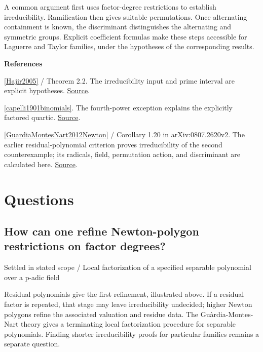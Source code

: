 \documentclass[11pt,a4paper,oneside,openany]{book}
\newenvironment{sources}{\par\smallskip\begingroup\footnotesize\color{atlasgray}\leftskip=10pt\setlength{\parskip}{2pt}}{\par\endgroup\smallskip}
\begin{document}
\color{black} A common argument first uses factor-degree restrictions to establish irreducibility. Ramification then gives suitable permutations. Once alternating containment is known, the discriminant distinguishes the alternating and symmetric groups. Explicit coefficient formulas make these steps accessible for Laguerre and Taylor families, under the hypotheses of the corresponding results.\par
\begin{sources}
\textbf{References}\par\smallskip
\noindent\hyperlink{ref:Hajir2005}{[Hajir2005]} / Theorem 2.2. The irreducibility input and prime interval are explicit hypotheses. \href{https://jtnb.centre-mersenne.org/item/JTNB_2005__17_2_517_0/}{Source}.\par
\noindent\hyperlink{ref:capelli1901binomials}{[capelli1901binomials]}. The fourth-power exception explains the explicitly factored quartic. \href{https://link.springer.com/article/10.1007/BF01450724}{Source}.\par
\noindent\hyperlink{ref:GuardiaMontesNart2012Newton}{[GuardiaMontesNart2012Newton]} / Corollary 1.20 in arXiv:0807.2620v2. The earlier residual-polynomial criterion proves irreducibility of the second counterexample; its radicals, field, permutation action, and discriminant are calculated here. \href{https://doi.org/10.1090/S0002-9947-2011-05442-5}{Source}.\par
\end{sources}\color{black}
\section*{Questions}
\subsection*{How can one refine Newton-polygon restrictions on factor degrees?}
{\small\sffamily\color{atlasgold}Settled in stated scope / Local factorization of a specified separable polynomial over a p-adic field}\par\smallskip
\color{black} Residual polynomials give the first refinement, illustrated above. If a residual factor is repeated, that stage may leave irreducibility undecided; higher Newton polygons refine the associated valuation and residue data. The Guàrdia-Montes-Nart theory gives a terminating local factorization procedure for separable polynomials. Finding shorter irreducibility proofs for particular families remains a separate question.\par
\end{document}
